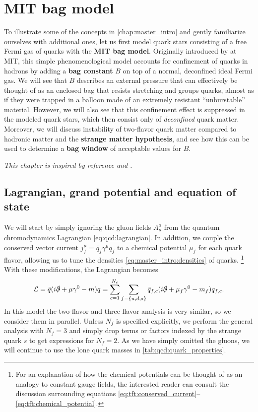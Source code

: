 \chapter{MIT bag model}
\label{chap:mit}

To illustrate some of the concepts in \cref{chap:master_intro} and gently familiarize ourselves with additional ones,
let us first model quark stars consisting of a free Fermi gas of quarks with the \textbf{MIT bag model}.
Originally introduced by \cite{ref:mit_bag_model_original} at MIT,
this simple phenomenological model accounts for confinement of quarks in hadrons by adding a \textbf{bag constant} $B$ on top of a normal, deconfined ideal Fermi gas.
We will see that $B$ describes an external pressure that can effectively be thought of as an enclosed bag that resists stretching and groups quarks,
almost as if they were trapped in a balloon made of an extremely resistant ``unburstable'' material.
However, we will also see that this confinement effect is suppressed in the modeled quark stars, which then consist only of \emph{deconfined} quark matter.
Moreover, we will discuss instability of two-flavor quark matter compared to hadronic matter 
and the \textbf{strange matter hypothesis},
and see how this can be used to determine a \textbf{bag window} of acceptable values for $B$.

\textit{This chapter is inspired by reference \cite{ref:glendenning} and \cite{ref:quark_bag_model}.}

\section{Lagrangian, grand potential and equation of state}
\label{sec:mit:eos}

We will start by simply ignoring the gluon fields $A_\mu^a$ from the quantum chromodynamics Lagrangian \eqref{eq:qcd:lagrangian}.
In addition, we couple the conserved vector current $j^\mu_f = \bar{q}_f \gamma^\mu q_f$ to a chemical potential $\mu_f$ for each quark flavor,
allowing us to tune the densities \eqref{eq:master_intro:densities} of quarks.%
\footnote{For an explanation of how the chemical potentials can be thought of as an analogy to constant gauge fields,
the interested reader can consult the discussion surrounding equations \eqref{eq:tft:conserved_current}--\eqref{eq:tft:chemical_potential}.}
With these modifications, the Lagrangian becomes
\begin{equation}
	\mathcal{L} = \bar{q} (i \slashed\partial + \mu \gamma^0 - m) q
	      = \sum_{c=1}^{N_c} \sum_{f=\{u,d,s\}} \bar{q}_{f,c} (i \slashed\partial + \mu_f \gamma^0 - m_f) q_{f,c} .
\label{eq:mit:lagrangian}
\end{equation}
In this model the two-flavor and three-flavor analysis is very similar, so we consider them in parallel.
Unless $N_f$ is specified explicitly, we perform the general analysis with $N_f=3$
and simply drop terms or factors indexed by the strange quark $s$ to get expressions for $N_f = 2$.
As we have simply omitted the gluons, we will continue to use the lone quark masses in \cref{tab:qcd:quark_properties}.

